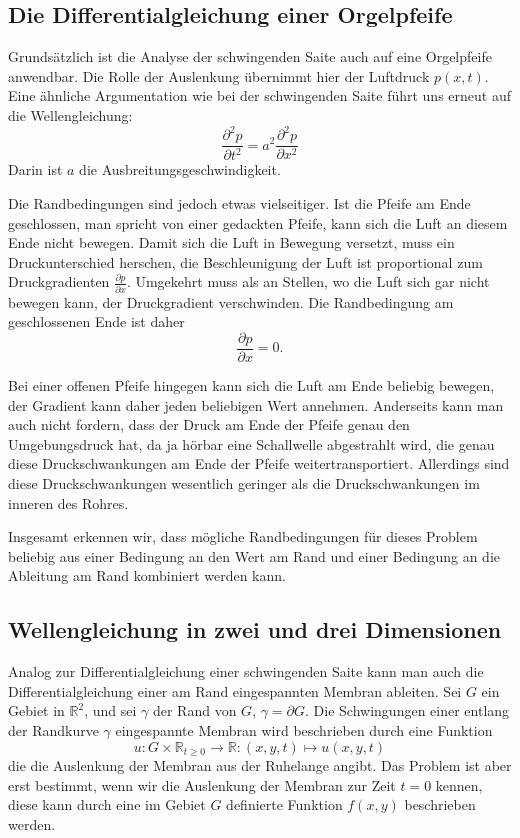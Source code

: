\subsection{Die Differentialgleichung einer Orgelpfeife\label{beispiele:orgelpfeife}}
Grundsätzlich ist die Analyse der schwingenden Saite auch auf
eine Orgelpfeife anwendbar. Die Rolle der Auslenkung übernimmt
hier der Luftdruck $p(x,t)$. Eine ähnliche Argumentation wie bei
der schwingenden Saite führt uns erneut auf die Wellengleichung:
\[
\frac{\partial^2p}{\partial t^2}=
a^2\frac{\partial^2p}{\partial x^2}
\]
Darin ist $a$ die Ausbreitungsgeschwindigkeit.

Die Randbedingungen sind jedoch etwas vielseitiger.
Ist die Pfeife am Ende geschlossen, man spricht von
einer gedackten Pfeife, kann sich die Luft an diesem Ende nicht bewegen.
Damit sich die Luft in Bewegung versetzt, muss ein Druckunterschied herschen,
die Beschleunigung der Luft ist proportional zum Druckgradienten
$\frac{\partial p}{\partial x}$. Umgekehrt muss als an Stellen, wo die
Luft sich gar nicht bewegen kann, der Druckgradient verschwinden.
Die Randbedingung am geschlossenen Ende ist daher
\[
\frac{\partial p}{\partial x}=0.
\]

Bei einer offenen Pfeife hingegen kann sich die Luft am Ende beliebig
bewegen, der Gradient kann daher jeden beliebigen Wert annehmen.
Anderseits kann man auch nicht fordern, dass der Druck am
Ende der Pfeife genau den Umgebungsdruck hat, da ja hörbar eine
Schallwelle abgestrahlt wird, die genau diese Druckschwankungen am
Ende der Pfeife weitertransportiert. Allerdings sind diese Druckschwankungen
wesentlich geringer als die Druckschwankungen im inneren des Rohres.

Insgesamt erkennen wir, dass mögliche Randbedingungen für dieses Problem
beliebig aus einer Bedingung an den Wert am Rand und einer Bedingung
an die Ableitung am Rand kombiniert werden kann.

\subsection{Wellengleichung in zwei und drei Dimensionen\label{beispiele:wellengleichung2d}}
Analog zur Differentialgleichung einer schwingenden Saite kann
man auch die Differentialgleichung einer am Rand eingespannten Membran
ableiten.
Sei $G$ ein Gebiet in $\mathbb R^2$, und sei $\gamma$ der Rand
von $G$, $\gamma = \partial G$. Die Schwingungen einer entlang der Randkurve
$\gamma$ eingespannte Membran wird beschrieben durch eine Funktion
\[
 u \colon G\times \mathbb R_{t \ge 0}\to\mathbb R\colon (x,y,t)\mapsto  u (x,y,t)
\]
die die Auslenkung der Membran aus der Ruhelange angibt. Das Problem ist aber
erst bestimmt, wenn wir die Auslenkung der Membran zur Zeit $t=0$ kennen,
diese kann durch eine im Gebiet $G$ definierte Funktion $f(x,y)$ beschrieben
werden.

